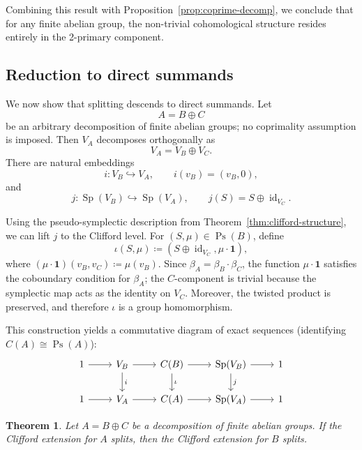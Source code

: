 \documentclass[11pt, reqno]{amsart}
\newtheorem{theorem}{Theorem}[section]
\theoremstyle{definition}
\theoremstyle{remark}
\DeclareMathOperator{\Sp}{Sp}
\DeclareMathOperator{\Ps}{Ps}
\DeclareMathOperator{\id}{id}
\begin{document}
Combining this result with Proposition~\ref{prop:coprime-decomp}, we conclude that for any finite abelian group, the non-trivial cohomological structure resides entirely in the 2-primary component.
\subsection{Reduction to direct summands}\label{sec:embedding}

We now show that splitting descends to direct summands. Let
\[
A = B \oplus C
\]
be an arbitrary decomposition of finite abelian groups; no coprimality assumption is imposed. Then $V_A$ decomposes orthogonally as
\[
V_A = V_B \oplus V_C.
\]
There are natural embeddings
\[
i:V_B\hookrightarrow V_A,\qquad i(v_B)=(v_B,0),
\]
and
\[
j:\Sp(V_B)\hookrightarrow \Sp(V_A),\qquad j(S)=S\oplus \id_{V_C}.
\]

Using the pseudo-symplectic description from Theorem~\ref{thm:clifford-structure}, we can lift $j$ to the Clifford level. For $(S,\mu)\in \Ps(B)$, define
\begin{equation}
\iota(S, \mu) \coloneqq (S \oplus \id_{V_C}, \mu \cdot \mathbf{1}),
\end{equation}
where $(\mu \cdot \mathbf{1})(v_B, v_C) \coloneqq \mu(v_B)$.
Since $\beta_A = \beta_B \cdot \beta_C$, the function $\mu \cdot \mathbf{1}$ satisfies the coboundary condition for $\beta_A$; the $C$-component is trivial because the symplectic map acts as the identity on $V_C$. Moreover, the twisted product is preserved, and therefore $\iota$ is a group homomorphism.

This construction yields a commutative diagram of exact sequences (identifying $C(A) \cong \Ps(A)$):
\begin{equation}
\begin{tikzcd}
1 \arrow[r] & V_B \arrow[r] \arrow[d, "i"] & C(B) \arrow[r] \arrow[d, "\iota"] & \Sp(V_B) \arrow[r] \arrow[d, "j"] & 1 \\
1 \arrow[r] & V_A \arrow[r] & C(A) \arrow[r] & \Sp(V_A) \arrow[r] & 1
\end{tikzcd}
\end{equation}

\begin{theorem}\label{thm:embedding}
Let $A = B \oplus C$ be a decomposition of finite abelian groups. If the Clifford extension for $A$ splits, then the Clifford extension for $B$ splits.
\end{theorem}
\end{document}
